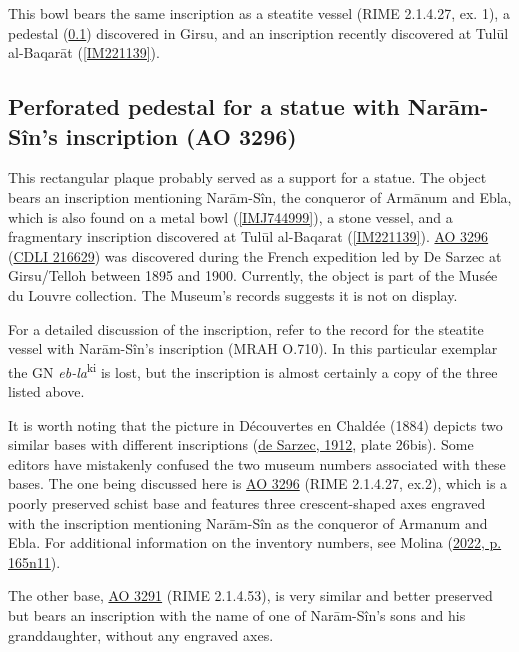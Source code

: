 \documentclass[
]{book}
\begin{document}
This bowl bears the same inscription as a steatite vessel (RIME 2.1.4.27, ex. 1), a pedestal (\ref{AO3296}) discovered in Girsu, and an inscription recently discovered at Tulūl al-Baqarāt (\ref{IM221139}).

\hypertarget{AO3296}{%
\subsection{Perforated pedestal for a statue with Narām-Sîn's inscription (AO 3296)}\label{AO3296}}

This rectangular plaque probably served as a support for a statue. The object bears an inscription mentioning Narām-Sîn, the conqueror of Armānum and Ebla, which is also found on a metal bowl (\ref{IMJ744999}), a stone vessel, and a fragmentary inscription discovered at Tulūl al-Baqarat (\ref{IM221139}). \href{Perforated\%20pedestal\%20for\%20a\%20statue\%20with\%20Narām-Sîn\textquotesingle{}s\%20inscription\%20(AO\%203296)}{AO 3296} (\href{https://cdli.mpiwg-berlin.mpg.de/artifacts/216629}{CDLI 216629}) was discovered during the French expedition led by De Sarzec at Girsu/Telloh between 1895 and 1900. Currently, the object is part of the Musée du Louvre collection. The Museum's records suggests it is not on display.

For a detailed discussion of the inscription, refer to the record for the steatite vessel with Narām-Sîn's inscription (MRAH O.710). In this particular exemplar the GN \emph{eb-la}\textsuperscript{ki} is lost, but the inscription is almost certainly a copy of the three listed above.

It is worth noting that the picture in Découvertes en Chaldée (1884) depicts two similar bases with different inscriptions (\protect\hyperlink{ref-deSarzec1912}{de Sarzec, 1912}, plate 26bis). Some editors have mistakenly confused the two museum numbers associated with these bases. The one being discussed here is \href{https://collections.louvre.fr/en/ark:/53355/cl010121772}{AO 3296} (RIME 2.1.4.27, ex.2), which is a poorly preserved schist base and features three crescent-shaped axes engraved with the inscription mentioning Narām-Sîn as the conqueror of Armanum and Ebla. For additional information on the inventory numbers, see Molina (\protect\hyperlink{ref-Molina2022}{2022, p. 165n11}).

The other base, \href{https://collections.louvre.fr/en/ark:/53355/cl010121771}{AO 3291} (RIME 2.1.4.53), is very similar and better preserved but bears an inscription with the name of one of Narām-Sîn's sons and his granddaughter, without any engraved axes.
\end{document}
